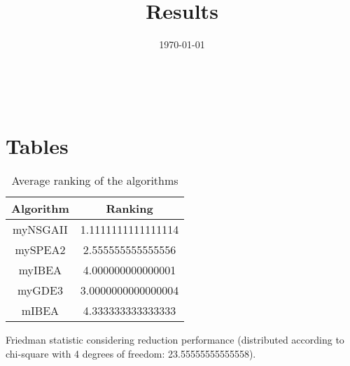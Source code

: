 \documentclass{article}
\title{Results}
\author{}
\date{\today}
\begin{document}
\oddsidemargin 0in \topmargin 0in\maketitle
\
\section{Tables}
\begin{table}[!htp]
\centering
\caption{Average ranking of the algorithms}
\begin{tabular}{c|c}
Algorithm&Ranking\\
\hline
myNSGAII&1.1111111111111114\\
mySPEA2&2.555555555555556\\
myIBEA&4.000000000000001\\
myGDE3&3.0000000000000004\\
mIBEA&4.333333333333333\\
\end{tabular}
\end{table}


Friedman statistic considering reduction performance (distributed according to chi-square with 4 degrees of freedom: 23.55555555555558).
\end{document}
